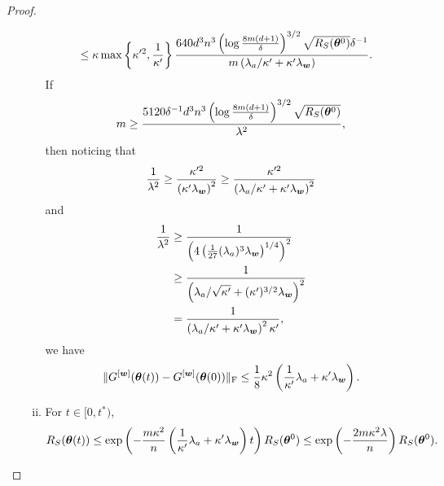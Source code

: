 \documentclass{article}
\begin{document}
\begin{proof}
\begin{enumerate}[(a)]
\begin{enumerate}[(i)]
\begin{equation*}
\begin{aligned}
                                 & \leq\kappa\max\left\{\kappa'^2,\frac{1}{\kappa'}\right\}\frac{640 d^3n^3\left(\log\frac{8m(d+1)}{\delta}\right)^{3/2}\sqrt{R_S(\bm{\theta}^0)}\delta^{-1}}{m\left(\lambda_a/\kappa'+\kappa'\lambda_{\bm{w}}\right)}.
                            \end{aligned}
                        \end{equation*}
                        If
                        \begin{equation*}
                            m\geq\frac{5120\delta^{-1}d^3n^3\left(\log\frac{8m(d+1)}{\delta}\right)^{3/2}\sqrt{R_S(\bm{\theta}^0)}}{\lambda^2},
                        \end{equation*}
                        then noticing that
                        \begin{equation*}
                            \frac{1}{\lambda^2} \geq\frac{\kappa'^2}{\left(\kappa'\lambda_{\bm{w}}\right)^2} \geq\frac{\kappa'^2}{\left(\lambda_a/\kappa'+\kappa'\lambda_{\bm{w}}\right)^2}
                        \end{equation*}
                        and
                        \begin{equation*}
                            \begin{aligned}
                                \frac{1}{\lambda^2}
                                 & \geq\frac{1}{\left(4\left(\frac{1}{27}(\lambda_a)^3\lambda_{\bm{w}}\right)^{1/4}\right) ^2}\\
                                 & \geq\frac{1}{\left(\lambda_a/\sqrt{\kappa'}+(\kappa')^{3/2}\lambda_{\bm{w}}\right)^2}\\
                                 & =\frac{1}{\left(\lambda_a/\kappa'+\kappa'\lambda_{\bm{w}}\right)^2\kappa'},
                            \end{aligned}
                        \end{equation*}
                        we have \begin{equation}\label{thm-proof:step2}
                            \lVert G^{[\bm{w}]}(\bm{\theta}(t))-G^{[\bm{w}]}(\bm{\theta}(0))\rVert_\mathrm{F}\leq\frac{1}{8}\kappa^2\left(\frac{1}{\kappa'}\lambda_a+\kappa'\lambda_{\bm{w}}\right).
                        \end{equation}
                  \item For $t\in[0,t^*)$,
                        \begin{equation*}
                            \RS(\vtheta(t))\leq\exp\left(-\frac{m\kappa^2}{n}\left(\frac{1}{\kappa'}\lambda_a+\kappa'\lambda_{\vw}\right)t\right)\RS(\vtheta^0)\leq\exp\left(-\frac{2m\kappa^2\lambda}{n}\right)\RS(\vtheta^0).

\end{equation*}
\end{enumerate}
\end{enumerate}
\end{proof}
\end{document}
